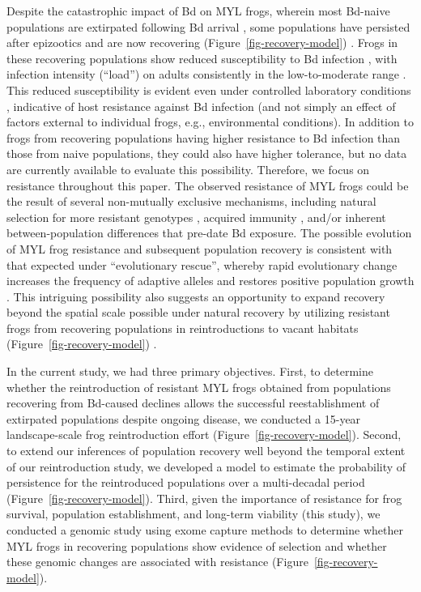 \documentclass[9pt,twocolumn,twoside,lineno]{pnas-new}
\begin{document}
Despite the catastrophic impact of Bd on MYL frogs, wherein most
Bd-naive populations are extirpated following Bd arrival
\citep{vredenburg2010}, some populations have persisted after epizootics
\citep[during which Bd infection intensity on frogs is very
high,][]{briggs2010} and are now recovering
(Figure~\ref{fig-recovery-model}) \citep{knapp2016}. Frogs in these
recovering populations show reduced susceptibility to Bd infection
\citep{knapp2016}, with infection intensity (``load'') on adults
consistently in the low-to-moderate range
\citep{briggs2010, knapp2011, joseph2018}. This reduced susceptibility
is evident even under controlled laboratory conditions
\citep{knapp2016}, indicative of host resistance against Bd infection
(and not simply an effect of factors external to individual frogs, e.g.,
environmental conditions). In addition to frogs from recovering
populations having higher resistance to Bd infection than those from
naive populations, they could also have higher tolerance, but no data
are currently available to evaluate this possibility. Therefore, we
focus on resistance throughout this paper. The observed resistance of
MYL frogs could be the result of several non-mutually exclusive
mechanisms, including natural selection for more resistant genotypes
\citep{savage2016, grogan2018b}, acquired immunity \citep{grogan2018a},
and/or inherent between-population differences that pre-date Bd
exposure. The possible evolution of MYL frog resistance and subsequent
population recovery is consistent with that expected under
``evolutionary rescue'', whereby rapid evolutionary change increases the
frequency of adaptive alleles and restores positive population growth
\citep{carlson2014, searle2020}. This intriguing possibility also
suggests an opportunity to expand recovery beyond the spatial scale
possible under natural recovery by utilizing resistant frogs from
recovering populations in reintroductions to vacant habitats
(Figure~\ref{fig-recovery-model}) \citep{joseph2018, mendelson2019}.

In the current study, we had three primary objectives. First, to
determine whether the reintroduction of resistant MYL frogs obtained
from populations recovering from Bd-caused declines allows the
successful reestablishment of extirpated populations despite ongoing
disease, we conducted a 15-year landscape-scale frog reintroduction
effort (Figure~\ref{fig-recovery-model}). Second, to extend our
inferences of population recovery well beyond the temporal extent of our
reintroduction study, we developed a model to estimate the probability
of persistence for the reintroduced populations over a multi-decadal
period (Figure~\ref{fig-recovery-model}). Third, given the importance of
resistance for frog survival, population establishment, and long-term
viability (this study), we conducted a genomic study using exome capture
methods to determine whether MYL frogs in recovering populations show
evidence of selection and whether these genomic changes are associated
with resistance (Figure~\ref{fig-recovery-model}).
\end{document}
